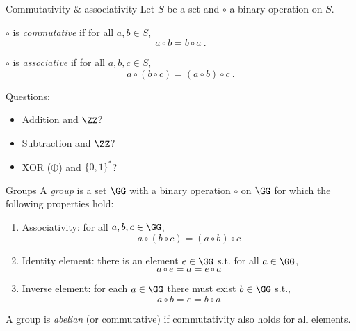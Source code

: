 \begin{frame}{Commutativity \& associativity}
  Let $S$ be a set and $\circ$ a binary operation on $S$.

  \pause
  $\circ$ is \emph{commutative} if for all $a, b\in S$,
  \[
      a \circ b = b \circ a\ .
  \]

  \pause
  $\circ$ is \emph{associative} if for all $a, b, c\in S$,
  \[
    a \circ (b \circ c) = (a \circ b) \circ c\ .
  \]

  \pause
  Questions:
  \begin{itemize}[<+(1)->]
    \item Addition and $\ZZ$?
    \item Subtraction and $\ZZ$?
    \item XOR ($\oplus$) and $\{0,1\}^*$?
  \end{itemize}
\end{frame}

\begin{frame}{Groups}
  A \emph{group} is a set $\GG$ with a binary operation $\circ$ on $\GG$ for which the following properties hold:
  \begin{enumerate}[<+(1)->]
    \item Associativity: for all $a, b, c\in \GG$,
    \[
      a \circ (b \circ c) = (a \circ b) \circ c
    \]
    \item Identity element: there is an element $e\in \GG$ s.t. for all $a\in \GG$,
    \[
      a \circ e = a = e \circ a
    \]
    \item Inverse element: for each $a\in \GG$ there must exist $b\in \GG$ s.t.,
    \[
      a \circ b = e = b \circ a
    \]
  \end{enumerate}
  \vspace*{-1em}
  \pause
  A group is \emph{abelian} (or commutative) if commutativity also holds for all elements.
\end{frame}

